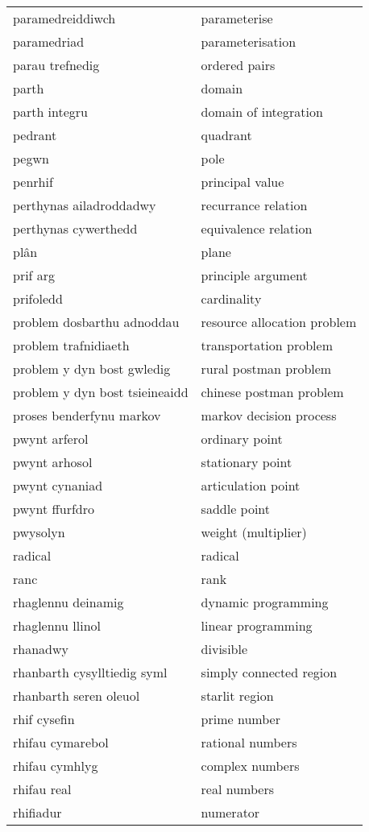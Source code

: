 \begin{supertabular}{p{0.22\textwidth}p{0.22\textwidth}}
paramedreiddiwch & parameterise \\
paramedriad & parameterisation \\
parau trefnedig & ordered pairs \\
parth & domain \\
parth integru & domain of integration \\
pedrant & quadrant \\
pegwn & pole \\
penrhif & principal value \\
perthynas ailadroddadwy & recurrance relation \\
perthynas cywerthedd & equivalence relation \\
plân & plane \\
prif arg & principle argument \\
prifoledd & cardinality \\
problem dosbarthu adnoddau & resource allocation problem \\
problem trafnidiaeth & transportation problem \\
problem y dyn bost gwledig & rural postman problem \\
problem y dyn bost tsieineaidd & chinese postman problem \\
proses benderfynu markov & markov decision process \\
pwynt arferol & ordinary point \\
pwynt arhosol & stationary point \\
pwynt cynaniad & articulation point \\
pwynt ffurfdro & saddle point \\
pwysolyn & weight (multiplier) \\
radical & radical \\
ranc & rank \\
rhaglennu deinamig & dynamic programming \\
rhaglennu llinol & linear programming \\
rhanadwy & divisible \\
rhanbarth cysylltiedig syml & simply connected region \\
rhanbarth seren oleuol & starlit region \\
rhif cysefin & prime number \\
rhifau cymarebol & rational numbers \\
rhifau cymhlyg & complex numbers \\
rhifau real & real numbers \\
rhifiadur & numerator \\

\end{supertabular}
